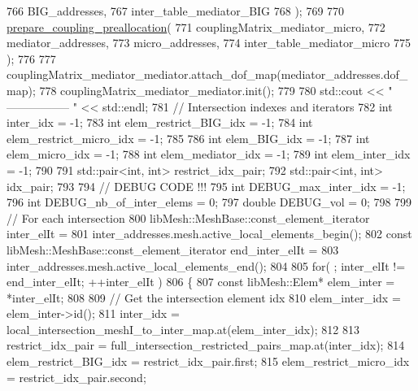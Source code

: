 \begin{DoxyCode}
766                 BIG\_addresses,
767                 inter\_table\_mediator\_BIG
768                 );
769 
770         \hyperlink{classcarl_1_1assemble__coupling__matrices_ace985578e3743b194f9058431735d997}{prepare\_coupling\_preallocation}(
771                 couplingMatrix\_mediator\_micro,
772                 mediator\_addresses,
773                 micro\_addresses,
774                 inter\_table\_mediator\_micro
775                 );
776 
777         couplingMatrix\_mediator\_mediator.attach\_dof\_map(mediator\_addresses.dof\_map);
778         couplingMatrix\_mediator\_mediator.init();
779 
780         std::cout << \textcolor{stringliteral}{" ----------------- "} << std::endl;
781         \textcolor{comment}{// Intersection indexes and iterators}
782         \textcolor{keywordtype}{int} inter\_idx = -1;
783         \textcolor{keywordtype}{int} elem\_restrict\_BIG\_idx = -1;
784         \textcolor{keywordtype}{int} elem\_restrict\_micro\_idx = -1;
785 
786         \textcolor{keywordtype}{int} elem\_BIG\_idx = -1;
787         \textcolor{keywordtype}{int} elem\_micro\_idx = -1;
788         \textcolor{keywordtype}{int} elem\_mediator\_idx = -1;
789         \textcolor{keywordtype}{int} elem\_inter\_idx = -1;
790 
791         std::pair<int, int> restrict\_idx\_pair;
792         std::pair<int, int> idx\_pair;
793 
794         \textcolor{comment}{// DEBUG CODE !!!}
795         \textcolor{keywordtype}{int} DEBUG\_max\_inter\_idx = -1;
796         \textcolor{keywordtype}{int} DEBUG\_nb\_of\_inter\_elems = 0;
797         \textcolor{keywordtype}{double} DEBUG\_vol = 0;
798 
799         \textcolor{comment}{// For each intersection}
800         libMesh::MeshBase::const\_element\_iterator           inter\_elIt =
801                 inter\_addresses.mesh.active\_local\_elements\_begin();
802         \textcolor{keyword}{const} libMesh::MeshBase::const\_element\_iterator     end\_inter\_elIt =
803                 inter\_addresses.mesh.active\_local\_elements\_end();
804 
805         \textcolor{keywordflow}{for}( ; inter\_elIt != end\_inter\_elIt; ++inter\_elIt )
806         \{
807             \textcolor{keyword}{const} libMesh::Elem* elem\_inter = *inter\_elIt;
808 
809             \textcolor{comment}{// Get the intersection element idx}
810             elem\_inter\_idx = elem\_inter->id();
811             inter\_idx = local\_intersection\_meshI\_to\_inter\_map.at(elem\_inter\_idx);
812 
813             restrict\_idx\_pair = full\_intersection\_restricted\_pairs\_map.at(inter\_idx);
814             elem\_restrict\_BIG\_idx = restrict\_idx\_pair.first;
815             elem\_restrict\_micro\_idx = restrict\_idx\_pair.second;

\end{DoxyCode}
